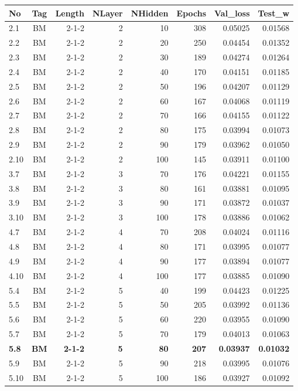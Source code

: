 \documentclass[a4paper, magyar]{article}
\begin{document}
\begin{small}
\begin{table}[p]
	\begin{tabular}{|l|c|r|r|r|r|r|r|}
		\hline
		No&Tag&Length&NLayer&NHidden&Epochs&Val\_loss&Test\_w\\
		\hline
		2.1&BM&2-1-2&2&10&308&0.05025&0.01568\\
		\hline
		2.2&BM&2-1-2&2&20&250&0.04454&0.01352\\
		\hline
		2.3&BM&2-1-2&2&30&189&0.04274&0.01264\\
		\hline
		2.4&BM&2-1-2&2&40&170&0.04151&0.01185\\
		\hline
		2.5&BM&2-1-2&2&50&196&0.04207&0.01129\\
		\hline
		2.6&BM&2-1-2&2&60&167&0.04068&0.01119\\
		\hline
		2.7&BM&2-1-2&2&70&166&0.04155&0.01122\\
		\hline
		2.8&BM&2-1-2&2&80&175&0.03994&0.01073\\
		\hline
		2.9&BM&2-1-2&2&90&179&0.03962&0.01050\\
		\hline
		2.10&BM&2-1-2&2&100&145&0.03911&0.01100\\
		\hline
		3.7&BM&2-1-2&3&70&176&0.04221&0.01155\\
		\hline
		3.8&BM&2-1-2&3&80&161&0.03881&0.01095\\
		\hline
		3.9&BM&2-1-2&3&90&171&0.03872&0.01037\\
		\hline
		3.10&BM&2-1-2&3&100&178&0.03886&0.01062\\
		\hline
		4.7&BM&2-1-2&4&70&208&0.04024&0.01116\\
		\hline
		4.8&BM&2-1-2&4&80&171&0.03995&0.01077\\
		\hline
		4.9&BM&2-1-2&4&90&177&0.03894&0.01077\\
		\hline
		4.10&BM&2-1-2&4&100&177&0.03885&0.01090\\
		\hline
		5.4&BM&2-1-2&5&40&199&0.04423&0.01225\\
		\hline
		5.5&BM&2-1-2&5&50&205&0.03992&0.01136\\
		\hline
		5.6&BM&2-1-2&5&60&220&0.03955&0.01090\\
		\hline
		5.7&BM&2-1-2&5&70&179&0.04013&0.01063\\
		\hline
		\textbf{5.8}&\textbf{BM}&\textbf{2-1-2}&\textbf{5}&\textbf{80}&\textbf{207}&\textbf{0.03937}&\textbf{0.01032}\\
		\hline
		5.9&BM&2-1-2&5&90&218&0.03995&0.01076\\
		\hline
		5.10&BM&2-1-2&5&100&186&0.03927&0.01092\\

\end{tabular}
\end{table}
\end{small}
\end{document}
